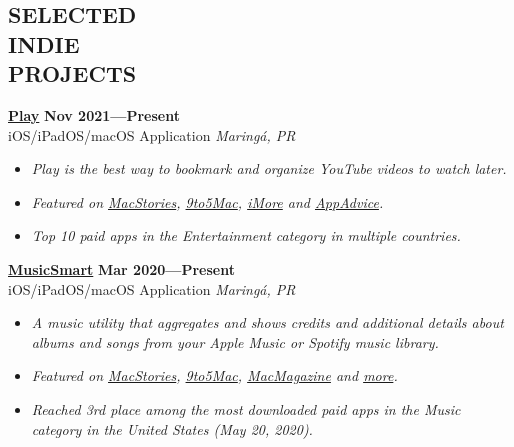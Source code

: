 \documentclass[line,margin]{res}
\begin{document}
\begin{resume}
\section{SELECTED \\ INDIE \\ PROJECTS}
  {\bf \href{https://apps.apple.com/us/app/id1596506190}{Play}} \hfill {\bf Nov 2021---Present} \\
  iOS/iPadOS/macOS Application \hfill {\sl Maring\'a, PR}\\[-6pt]
    \begin{itemize}
    \item {\sl Play is the best way to bookmark and organize YouTube videos to watch later.}
    \item {\sl Featured on \href{https://www.macstories.net/reviews/play-a-fantastic-utility-for-saving-and-organizing-youtube-videos-for-later/}{MacStories}, \href{https://9to5mac.com/2022/02/11/play-app-lets-you-access-youtube-videos-directly-from-your-home-screen/}{9to5Mac}, \href{https://www.imore.com/play-app-saving-youtube-videos-you-want-watch-later}{iMore} and \href{https://appadvice.com/post/bookmark-youtube-videos-to-watch-later-with-the-new-app-play/773234}{AppAdvice}.}
    \item {\sl Top 10 paid apps in the Entertainment category in multiple countries.}
    \end{itemize}
    
  {\bf \href{https://apps.apple.com/us/app/musicsmart/id1512195368}{MusicSmart}} \hfill {\bf Mar 2020---Present} \\
  iOS/iPadOS/macOS Application \hfill {\sl Maring\'a, PR}\\[-6pt]
    \begin{itemize}
    \item {\sl A music utility that aggregates and shows credits and additional details about albums and songs from your Apple Music or Spotify music library.}
    \item {\sl Featured on \href{https://www.macstories.net/reviews/musicsmart-puts-the-spotlight-on-music-credits/}{MacStories}, \href{https://9to5mac.com/2020/05/19/musicsmart-apple-music-app/}{9to5Mac}, \href{https://macmagazine.uol.com.br/post/2020/05/21/aplicativo-brasileiro-musicsmart-traz-detalhes-aprofundados-sobre-as-cancoes-do-apple-music/}{MacMagazine} and \href{https://twitter.com/chockenberry/status/1262803700658999296}{more}.}
    \item {\sl Reached 3rd place among the most downloaded paid apps in the Music category in the United States (May 20, 2020).}
    \end{itemize}
  

\end{resume}
\end{document}
